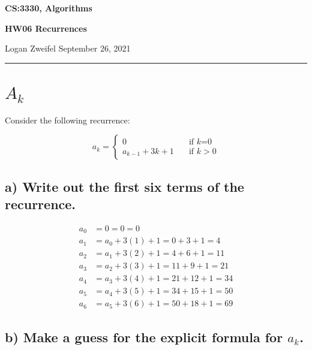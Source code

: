 \documentclass[11pt]{article}
\begin{document}
\thispagestyle{empty}

\begin{center}
\bf\large CS:3330, Algorithms
\end{center}

\begin{center}
\bf\large HW06 Recurrences  %
\end{center}

\noindent
Logan Zweifel     %
\hfill
September 26, 2021           %

\noindent
\rule{\textwidth}{1pt}

\medskip


\section{$A_k$} %
Consider the following recurrence:

\[ a_k =
  \begin{cases}
    0       & \quad \text{if }  k \text{=0}\\
    a_{k-1}+3k+1       & \quad \text{if } k \text{$>0$}
  \end{cases}
\]

\subsection*{a) Write out the first six terms of the recurrence.}

\bigskip
\bigskip

\begin{align*}
a_0 &= 0 = 0 = 0 \\
a_1 &= a_0 + 3(1) +1 = 0 + 3 + 1 = 4 \\
a_2 &= a_1 + 3(2) +1 = 4 + 6 + 1 = 11 \\
a_3 &= a_2 + 3(3) +1 = 11 + 9 + 1 = 21 \\
a_4 &= a_3 + 3(4) +1 = 21 + 12 + 1 = 34 \\
a_5 &= a_4 + 3(5) +1 = 34 + 15 + 1 = 50 \\
a_6 &= a_5 + 3(6) +1 = 50 + 18 + 1 = 69 
\end{align*}

\bigskip


\subsection*{b) Make a guess for the explicit formula for $a_k$.}
\end{document}
